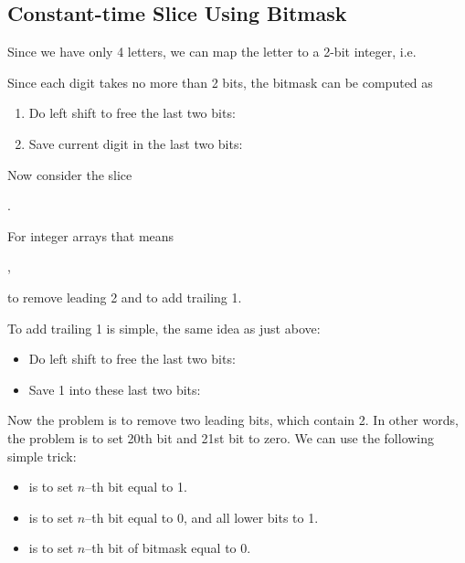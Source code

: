 \subsection{Constant-time Slice Using Bitmask}
Since we have only 4 letters, we can map the letter to a 2-bit integer, i.e.






Since each digit takes no more than 2 bits, the bitmask can be computed as

\begin{enumerate}
\item Do left shift to free the last two bits: 

\item Save current digit in the last two bits: 
\end{enumerate}

Now consider the slice 

. 

For integer arrays that means 

, 

to remove leading 2 and to add trailing 1.

To add trailing 1 is simple, the same idea as just above:

\begin{itemize}
\item Do left shift to free the last two bits: 

\item Save 1 into these last two bits: 
\end{itemize}

Now the problem is to remove two leading bits, which contain 2. In other words, the problem is to set 20th bit and 21st bit to zero. We can use the following simple trick:

\begin{itemize}
\item {} is to set $n$--th bit equal to 1.

\item {} is to set $n$--th bit equal to 0, and all lower bits to 1.

\item {} is to set $n$--th bit of bitmask equal to 0.
\end{itemize}

